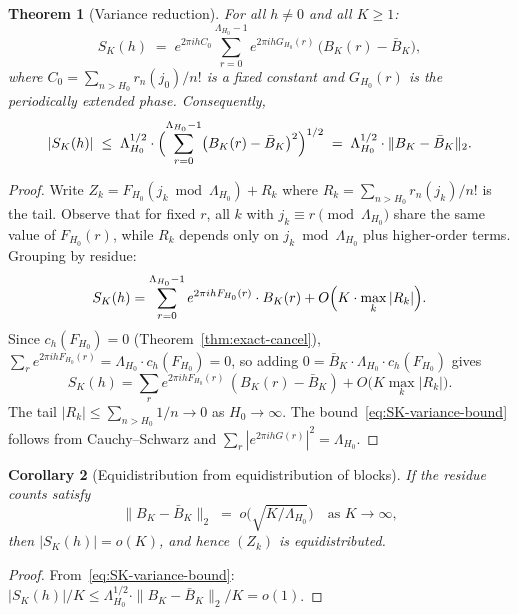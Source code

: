\documentclass[
]{article}
\newtheorem{theorem}{Theorem}[section]
\newtheorem{corollary}[theorem]{Corollary}
\begin{document}
\begin{theorem}[Variance reduction]\label{thm:variance-reduction}
For all $h\ne 0$ and all $K\ge 1$:
\begin{equation}\label{eq:variance-reduction}
  S_K(h) \;=\; e^{2\pi i h C_0}\sum_{r=0}^{\Lambda_{H_0}-1}
    e^{2\pi i h G_{H_0}(r)}\,\bigl(B_K(r) - \bar{B}_K\bigr),
\end{equation}
where $C_0 = \sum_{n>H_0} r_n(j_0)/n!$ is a fixed constant and
$G_{H_0}(r)$ is the periodically extended phase.
Consequently,
\begin{equation}\label{eq:SK-variance-bound}
  |S_K(h)| \;\le\; \Lambda_{H_0}^{1/2}\cdot
    \Bigl(\sum_{r=0}^{\Lambda_{H_0}-1}
      \bigl(B_K(r)-\bar{B}_K\bigr)^2\Bigr)^{1/2}
  \;=\; \Lambda_{H_0}^{1/2}\cdot\|B_K - \bar{B}_K\|_2.
\end{equation}
\end{theorem}

\begin{proof}
Write $Z_k = F_{H_0}(j_k\bmod\Lambda_{H_0}) + R_k$ where
$R_k = \sum_{n>H_0} r_n(j_k)/n!$ is the tail.  Observe that for
fixed $r$, all $k$ with $j_k\equiv r\pmod{\Lambda_{H_0}}$ share the
same value of $F_{H_0}(r)$, while $R_k$ depends only on $j_k\bmod\Lambda_{H_0}$
plus higher-order terms.  Grouping by residue:
\[
  S_K(h) = \sum_{r=0}^{\Lambda_{H_0}-1} e^{2\pi i h F_{H_0}(r)}\cdot B_K(r)
          + O\Bigl(K\cdot\max_k|R_k|\Bigr).
\]
Since $c_h(F_{H_0})=0$ (Theorem~\ref{thm:exact-cancel}),
$\sum_r e^{2\pi i h F_{H_0}(r)} = \Lambda_{H_0}\cdot c_h(F_{H_0}) = 0$,
so adding $0 = \bar{B}_K\cdot\Lambda_{H_0}\cdot c_h(F_{H_0})$ gives
\[
  S_K(h) = \sum_{r} e^{2\pi i h F_{H_0}(r)}\,(B_K(r)-\bar{B}_K)
          + O\bigl(K\max_k|R_k|\bigr).
\]
The tail $|R_k| \le \sum_{n>H_0} 1/n \to 0$ as $H_0\to\infty$.
The bound~\eqref{eq:SK-variance-bound} follows from Cauchy--Schwarz
and $\sum_r|e^{2\pi i h G(r)}|^2 = \Lambda_{H_0}$.
\end{proof}

\begin{corollary}[Equidistribution from equidistribution of blocks]
\label{cor:block-equidist}
If the residue counts satisfy
\begin{equation}\label{eq:block-equidist}
  \|B_K - \bar{B}_K\|_2 \;=\; o\bigl(\sqrt{K/\Lambda_{H_0}}\bigr)
  \quad\text{as }K\to\infty,
\end{equation}
then $|S_K(h)| = o(K)$, and hence $(Z_k)$ is equidistributed.
\end{corollary}

\begin{proof}
From~\eqref{eq:SK-variance-bound}:
$|S_K(h)|/K \le \Lambda_{H_0}^{1/2}\cdot\|B_K-\bar{B}_K\|_2/K = o(1)$.
\end{proof}
\end{document}
